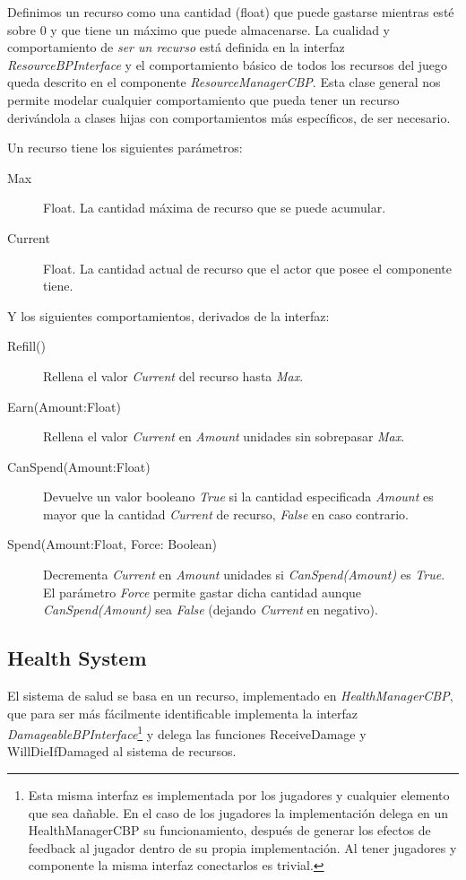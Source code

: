 \documentclass[12pt]{report}
\begin{document}
Definimos un recurso como una cantidad (float) que puede gastarse mientras esté sobre 0 y que tiene un máximo que puede almacenarse. La cualidad y comportamiento de \textit{ser un recurso} está definida en la interfaz \textit{\emph{ResourceBPInterface}} y el comportamiento básico de todos los recursos del juego queda descrito en el componente \textit{\emph{ResourceManagerCBP}}. Esta clase general nos permite modelar cualquier comportamiento que pueda tener un recurso derivándola a clases hijas con comportamientos más específicos, de ser necesario.

Un recurso tiene los siguientes parámetros:

\begin{description}
	\item[Max] Float. La cantidad máxima de recurso que se puede acumular.
	\item[Current] Float. La cantidad actual de recurso que el actor que posee el componente tiene.
\end{description}

Y los siguientes comportamientos, derivados de la interfaz:

\begin{description}
	\item[Refill()] Rellena el valor \textit{Current} del recurso hasta \textit{Max}.
	\item[Earn(Amount:Float)] Rellena el valor \textit{Current} en \textit{Amount} unidades sin sobrepasar \textit{Max}.
	\item[CanSpend(Amount:Float)] Devuelve un valor booleano \textit{True} si la cantidad especificada \textit{Amount} es mayor que la cantidad \textit{Current} de recurso, \textit{False} en caso contrario.
	\item[Spend(Amount:Float, Force: Boolean)] Decrementa \textit{Current} en \textit{Amount} unidades si \textit{CanSpend(Amount)} es \textit{True}. El parámetro \textit{Force} permite gastar dicha cantidad aunque \textit{CanSpend(Amount)} sea \textit{False} (dejando \textit{Current} en negativo).
\end{description}

\subsection{Health System}

El sistema de salud se basa en un recurso, implementado en \textit{\emph{HealthManagerCBP}}, que para ser más fácilmente identificable implementa la interfaz \textit{\emph{DamageableBPInterface}}\footnote{Esta misma interfaz es implementada por los jugadores y cualquier elemento que sea dañable. En el caso de los jugadores la implementación delega en un HealthManagerCBP su funcionamiento, después de generar los efectos de feedback al jugador dentro de su propia implementación. Al tener jugadores y componente la misma interfaz conectarlos es trivial.} y delega las funciones ReceiveDamage y WillDieIfDamaged al sistema de recursos.
\end{document}

